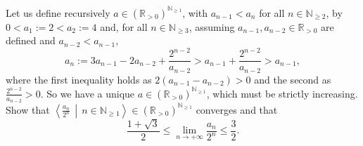 \begin{problem}
    Let us define recursively \( a \in \left(\mathbb{R}_{>0}\right)^{\mathbb{N}_{\geq 1}} \), with \( a_{n-1} < a_n \) for all \( n \in \mathbb{N}_{\geq 2} \), by \( 0 < a_1 := 2 < a_2 := 4 \) and, for all \( n \in \mathbb{N}_{\geq 3} \), assuming \( a_{n-1}, a_{n-2} \in \mathbb{R}_{>0} \) are defined and \( a_{n-2} < a_{n-1} \),
    \[
        a_n := 3a_{n-1}-2a_{n-2}+\frac{2^{n-2}}{a_{n-2}} > a_{n-1}+\frac{2^{n-2}}{a_{n-2}} > a_{n-1},
    \]
    where the first inequality holds as \( 2\left(a_{n-1}-a_{n-2}\right) > 0 \) and the second as \( \frac{2^{n-2}}{a_{n-2}} > 0 \). So we have a unique \( a \in \left(\mathbb{R}_{>0}\right)^{\mathbb{N}_{\geq 1}} \), which must be strictly increasing. Show that \( \left\langle \frac{a_n}{2^n} \,\middle|\, n \in \mathbb{N}_{\geq 1} \right\rangle \in \left(\mathbb{R}_{>0}\right)^{\mathbb{N}_{\geq 1}} \) converges and that
    \[
        \frac{1+\sqrt{3}}{2} \leq \lim_{n \to +\infty} \frac{a_n}{2^n} \leq \frac{3}{2}.
    \]
\end{problem}
